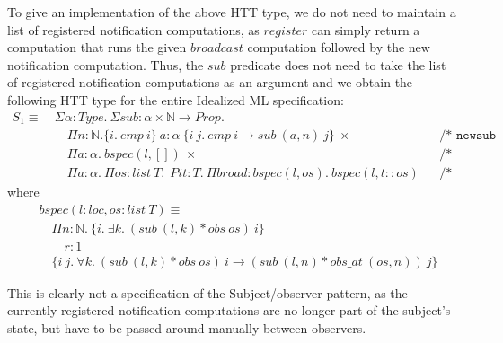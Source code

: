 \documentclass[a4paper,english]{article}
\newcommand{\N}[0]{\mathbb{N}}
\newcommand{\HPROP}[0]{Prop}
\newcommand{\TYPE}[0]{Type}
\newcommand{\LIST}[0]{list}
\newcommand{\LOC}[0]{loc}
\newcommand{\pname}[1]{\texttt{/* #1 */}}
\begin{document}
To give an implementation of the above HTT type, we do not need to maintain a
list of registered notification computations, as $register$ can simply return a
computation that runs the given $broadcast$ computation followed by the new
notification computation. Thus, the $sub$ predicate does not need to take the
list of registered notification computations as an argument and we obtain the
following HTT type for the entire Idealized ML specification:
\begin{align*}
S_1 \equiv\ &\Sigma \alpha : \TYPE.\ \Sigma sub : \alpha \times \N \rightarrow \HPROP.\\
&\quad \Pi n : \N. \{ i.\ emp\ i\}\ a : \alpha\ \{i\ j.\ emp\ i \rightarrow sub\ (a, n)\ j \}\ \times && \pname{newsub}\\
&\quad \Pi a : \alpha.\ bspec(l, [])\ \times && \pname{broadcast}\\
&\quad \Pi a : \alpha.\ \Pi os : \LIST\ T.\ \ Pi t : T.\ \Pi broad : bspec(l, os).\ bspec(l, t::os) && \pname{register}
\end{align*}
where
\begin{align*}
& bspec(l : \LOC, os : \LIST\ T) \equiv\\
&\quad \Pi n : \N.\ \{ i.\ \exists k.\ (sub\ (l, k) * obs\ os)\ i \}\\
&\quad\quad r : 1\\
&\quad \{ i\ j.\ \forall k.\ (sub\ (l, k) * obs\ os)\ i \rightarrow (sub\ (l, n) * obs\_at\ (os, n))\ j \}
\end{align*}

This is clearly not a specification of the Subject/observer pattern, as the
currently registered notification computations are no longer part of the
subject's state, but have to be passed around manually between observers. 
\end{document}
